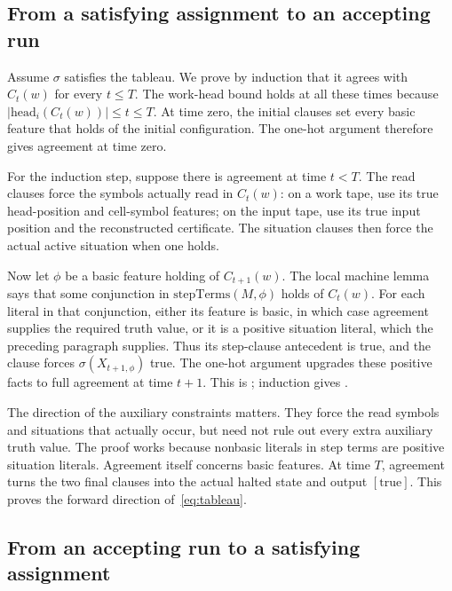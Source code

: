 \subsection{From a satisfying assignment to an accepting run}

Assume $\sigma$ satisfies the tableau. We prove by induction that it agrees with
$C_t(w)$ for every $t\leq T$. The work-head bound holds at all these times because
$|\mathrm{head}_i(C_t(w))|\leq t\leq T$.
At time zero, the initial clauses set every basic feature that holds of the initial
configuration. The one-hot argument therefore gives agreement at time zero.

For the induction step, suppose there is agreement at time $t<T$.
The read clauses force the symbols actually read in $C_t(w)$: on a work tape,
use its true head-position and cell-symbol features; on the input tape, use its
true input position and the reconstructed certificate. The situation clauses then
force the actual active situation when one holds.

Now let $\phi$ be a basic feature holding of $C_{t+1}(w)$.
The local machine lemma
says that some conjunction in $\mathrm{stepTerms}(M,\phi)$ holds of $C_t(w)$.
For each literal in that conjunction, either its feature is basic, in which case
agreement supplies the required truth value, or it is a positive situation literal,
which the preceding paragraph supplies. Thus its step-clause antecedent is true,
and the clause forces $\sigma(X_{t+1,\phi})$ true.
The one-hot argument upgrades these positive facts to full agreement at time $t+1$.
This is
;
induction gives
.

The direction of the auxiliary constraints matters. They force the read symbols
and situations that actually occur, but need not rule out every extra auxiliary
truth value. The proof works because nonbasic literals in step terms are positive
situation literals. Agreement itself concerns basic features.
At time $T$, agreement turns the two final clauses into the actual halted state
and output $[\mathrm{true}]$. This proves the forward direction of~\eqref{eq:tableau}.

\subsection{From an accepting run to a satisfying assignment}

